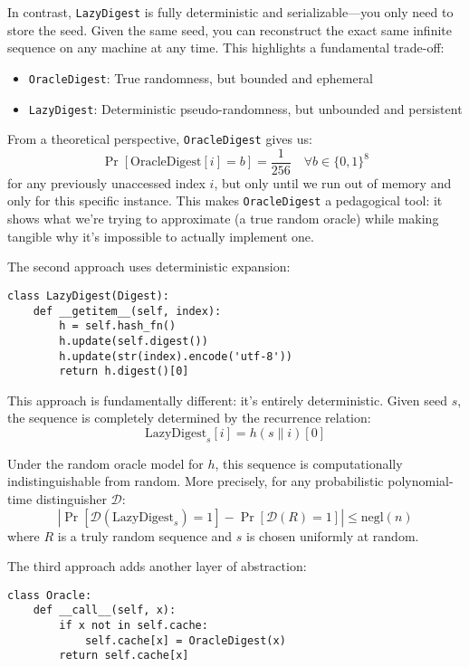 \documentclass[11pt]{article}
\begin{document}
In contrast, \texttt{LazyDigest} is fully deterministic and serializable---you only need to store the seed. Given the same seed, you can reconstruct the exact same infinite sequence on any machine at any time. This highlights a fundamental trade-off:
\begin{itemize}
\item \texttt{OracleDigest}: True randomness, but bounded and ephemeral
\item \texttt{LazyDigest}: Deterministic pseudo-randomness, but unbounded and persistent
\end{itemize}

From a theoretical perspective, \texttt{OracleDigest} gives us:
$$\Pr[\text{OracleDigest}[i] = b] = \frac{1}{256} \quad \forall b \in \{0,1\}^8$$
for any previously unaccessed index $i$, but only until we run out of memory and only for this specific instance. This makes \texttt{OracleDigest} a pedagogical tool: it shows what we're trying to approximate (a true random oracle) while making tangible why it's impossible to actually implement one.

The second approach uses deterministic expansion:

\begin{lstlisting}
class LazyDigest(Digest):
    def __getitem__(self, index):
        h = self.hash_fn()
        h.update(self.digest())
        h.update(str(index).encode('utf-8'))
        return h.digest()[0]
\end{lstlisting}

This approach is fundamentally different: it's entirely deterministic. Given seed $s$, the sequence is completely determined by the recurrence relation:
$$\text{LazyDigest}_s[i] = h(s \| i)[0]$$

Under the random oracle model for $h$, this sequence is computationally indistinguishable from random. More precisely, for any probabilistic polynomial-time distinguisher $\mathcal{D}$:
$$\left|\Pr[\mathcal{D}(\text{LazyDigest}_s) = 1] - \Pr[\mathcal{D}(R) = 1]\right| \leq \text{negl}(n)$$
where $R$ is a truly random sequence and $s$ is chosen uniformly at random.

The third approach adds another layer of abstraction:

\begin{lstlisting}
class Oracle:
    def __call__(self, x):
        if x not in self.cache:
            self.cache[x] = OracleDigest(x)
        return self.cache[x]
\end{lstlisting}
\end{document}
